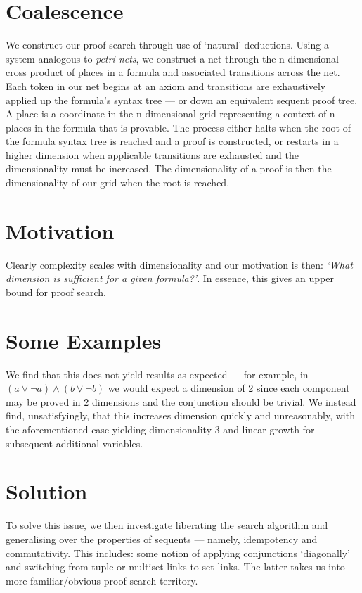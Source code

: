     \section*{Coalescence}
        We construct our proof search through use of `natural' deductions.
        Using a system analogous to \textit{petri nets}, we construct a net through the n-dimensional cross product of places in a formula and associated transitions across the net.
        Each token in our net begins at an axiom and transitions are exhaustively applied up the formula's syntax tree --- or down an equivalent sequent proof tree.
        A place is a coordinate in the n-dimensional grid representing a context of n places in the formula that is provable.
        The process either halts when the root of the formula syntax tree is reached and a proof is constructed, or restarts in a higher dimension when applicable transitions are exhausted and the dimensionality must be increased.
        The dimensionality of a proof is then the dimensionality of our grid when the root is reached.

    \section*{Motivation}
        Clearly complexity scales with dimensionality and our motivation is then: \textit{`What dimension is sufficient for a given formula?'}.
        In essence, this gives an upper bound for proof search.

    \section*{Some Examples}
        We find that this does not yield results as expected --- for example, in $(a \vee \neg a) \wedge (b \vee \neg b)$ we would expect a dimension of 2 since each component may be proved in 2 dimensions and the conjunction should be trivial.
        We instead find, unsatisfyingly, that this increases dimension quickly and unreasonably, with the aforementioned case yielding dimensionality 3 and linear growth for subsequent additional variables.

    \section*{Solution}
        To solve this issue, we then investigate liberating the search algorithm and generalising over the properties of sequents --- namely, idempotency and commutativity.
        This includes: some notion of applying conjunctions `diagonally' and switching from tuple or multiset links to set links.
        The latter takes us into more familiar/obvious proof search territory.
        
